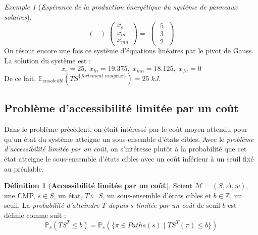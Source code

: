 \documentclass[12pt,a4paper]{report}
\theoremstyle{definition}%
\newtheorem{definition}{Définition}[chapter]
\theoremstyle{remark}
\newtheorem{example}{Exemple}[chapter]
\newcommand{\pr}{\mathbb{P}}
\begin{document}
\begin{example}[\textit{Espérance de la production énergétique du système de panneaux solaires}]
\[\begin{pmatrix}
\end{pmatrix}
\;
\begin{pmatrix}
x_{e} \\[0.3em] x _{ln} \\[0.3em] x_{mn}
\end{pmatrix}
= \;
\begin{pmatrix}
\;5 \; \\[0.3em] \; 3 \; \\[0.3em] \; 2 \;
\end{pmatrix}
\]
On résout encore une fois ce système d'équations linéaires par le pivot de Gauss. La solution du système est :
\[ x_e = 25, \; x_{ln} = 19.375, \; x_{mn} = 18.125, \; x_{fn} = 0  \]
De ce fait, $\mathbb{E}_{\textit{ensoleillé}} (TS^{\{\textit{fortement nuageux}\}}) = 25\; kJ$.
\end{example}

\subsection{Problème d'accessibilité limitée par un coût}
Dans le problème précédent, on était intéressé par le coût moyen attendu pour qu'un état du système atteigne un sous-ensemble d'états cibles. Avec le \textit{problème d'accessibilité limitée par un coût}, on s'intéresse plutôt à la probabilité que cet état atteigne le sous-ensemble d'états cibles avec un coût inférieur à un seuil fixé au préalable.

\begin{definition}[\textbf{Accessibilité limitée par un coût}]
	Soient $\mathcal{M} = (S, \Delta, w)$, une CMP, $s \in S$, un état, $T \subseteq S$, un sous-ensemble d'états cibles et $b \in \mathbb{Z}$, un seuil. La \textit{probabilité d'atteindre $T$ depuis $s$ limitée par un coût} de seuil $b$ est définie comme suit :
	\[\pr_s(TS^T \leq b) = \pr_s(\{\pi \in Paths(s) \; | \; TS^T(\pi) \leq b \}) \]
\end{definition}
\end{document}
